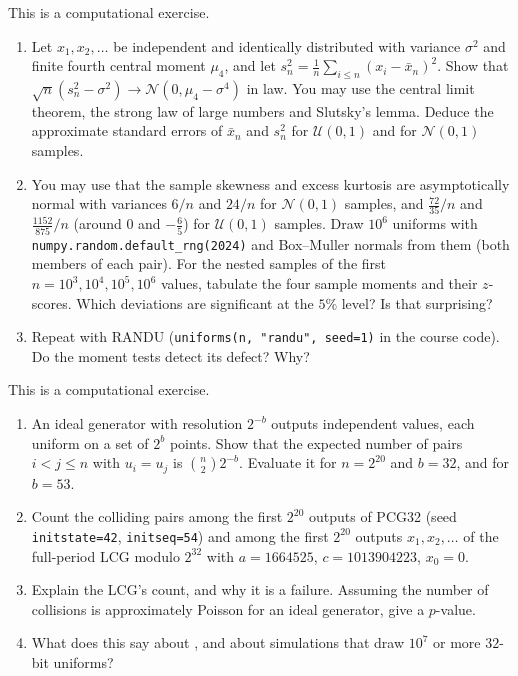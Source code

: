 \begin{exercise}\label{ex:rng-moment-tests}
\medium This is a computational exercise.
\begin{enumerate}[label=(\alph*)]
  \item Let $x_1,x_2,\dots$ be independent and identically distributed with variance
    $\sigma^2$ and finite fourth central moment $\mu_4$, and let
    $s_n^2=\frac1n\sum_{i\le n}(x_i-\bar x_n)^2$. Show that
    $\sqrt n(s_n^2-\sigma^2)\to\mathcal N(0,\mu_4-\sigma^4)$ in law. You may use the central
    limit theorem, the strong law of large numbers and Slutsky's lemma. Deduce the
    approximate standard errors of $\bar x_n$ and $s_n^2$ for $\mathcal U(0,1)$ and for
    $\mathcal N(0,1)$ samples.
  \item You may use that the sample skewness and excess kurtosis are asymptotically normal
    with variances $6/n$ and $24/n$ for $\mathcal N(0,1)$ samples, and $\frac{72}{35}/n$ and
    $\frac{1152}{875}/n$ (around $0$ and $-\frac65$) for $\mathcal U(0,1)$ samples. Draw
    $10^6$ uniforms with \texttt{numpy.random.default\_rng(2024)} and Box--Muller normals from
    them (both members of each pair). For the nested samples of the first $n=10^3,10^4,10^5,
    10^6$ values, tabulate the four sample moments and their $z$-scores. Which deviations
    are significant at the $5\%$ level? Is that surprising?
  \item Repeat with RANDU (\texttt{uniforms(n, "randu", seed=1)} in the course code). Do the
    moment tests detect its defect? Why?
\end{enumerate}
\end{exercise}

\begin{exercise}\label{ex:rng-birthday}
\medium This is a computational exercise.
\begin{enumerate}[label=(\alph*)]
  \item An ideal generator with resolution $2^{-b}$ outputs independent values, each
    uniform on a set of $2^b$ points. Show that the expected number of pairs $i<j\le n$ with
    $u_i=u_j$ is $\binom n2 2^{-b}$. Evaluate it for $n=2^{20}$ and $b=32$, and for $b=53$.
  \item Count the colliding pairs among the first $2^{20}$ outputs of PCG32 (seed
    \texttt{initstate=42}, \texttt{initseq=54}) and among the first $2^{20}$ outputs
    $x_1,x_2,\dots$ of the full-period LCG modulo $2^{32}$ with $a=1664525$,
    $c=1013904223$, $x_0=0$.
  \item Explain the LCG's count, and why it is a failure. Assuming the number of collisions
    is approximately Poisson for an ideal generator, give a $p$-value.
  \item What does this say about , and about simulations that
    draw $10^7$ or more $32$-bit uniforms?
\end{enumerate}
\end{exercise}
